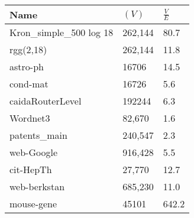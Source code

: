 
\centering
{}
\begin{tabular}{@{}lll@{}}
\toprule 
Name                               & $\left(V\right)$             & $\frac{V}{E}$              \\ 
\midrule
Kron\_simple\_500 log 18           & 262,144                      & 80.7                       \\ 
rgg(2,18)                          & 262,144                      & 11.8                       \\ 
astro-ph                           & 16706                        & 14.5                       \\ 
cond-mat                           & 16726                        & 5.6                        \\ 
caidaRouterLevel                   & 192244                       & 6.3                        \\ 
Wordnet3                           & 82,670                       & 1.6                        \\ 
patents\_main                      & 240,547                      & 2.3                        \\ 
web-Google                         & 916,428                      & 5.5                        \\ 
cit-HepTh                          & 27,770                       & 12.7                       \\ 
web-berkstan 					   & 685,230 					  & 11.0  					   \\ 
mouse-gene   					   & 45101   					  & 642.2 					   \\ 
\bottomrule
\end{tabular}
